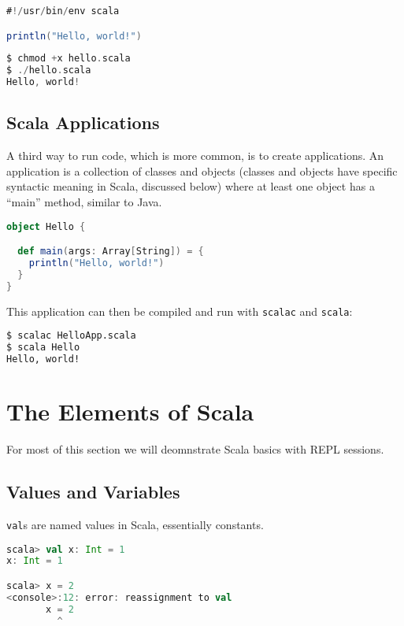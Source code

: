 \begin{lstlisting}[language=Scala]
#!/usr/bin/env scala

println("Hello, world!")
\end{lstlisting}

\begin{lstlisting}[language=Scala]
$ chmod +x hello.scala
$ ./hello.scala
Hello, world!
\end{lstlisting}


\subsection{Scala Applications}

A third way to run code, which is more common, is to create applications. An application is a collection of classes and objects (classes and objects have specific syntactic meaning in Scala, discussed below) where at least one object has a ``main'' method, similar to Java.

\newpage

\begin{lstlisting}[language=Scala]
object Hello {

  def main(args: Array[String]) = {
    println("Hello, world!")
  }
}
\end{lstlisting}


This application can then be compiled and run with {\tt scalac} and {\tt scala}:

\begin{lstlisting}[language=Bash]
$ scalac HelloApp.scala
$ scala Hello
Hello, world!
\end{lstlisting}


\section{The Elements of Scala}

For most of this section we will deomnstrate Scala basics with REPL sessions.

\subsection{Values and Variables}

{\tt val}s are named values in Scala, essentially constants.

\begin{lstlisting}[language=Scala]
scala> val x: Int = 1
x: Int = 1

scala> x = 2
<console>:12: error: reassignment to val
       x = 2
         ^
\end{lstlisting}

